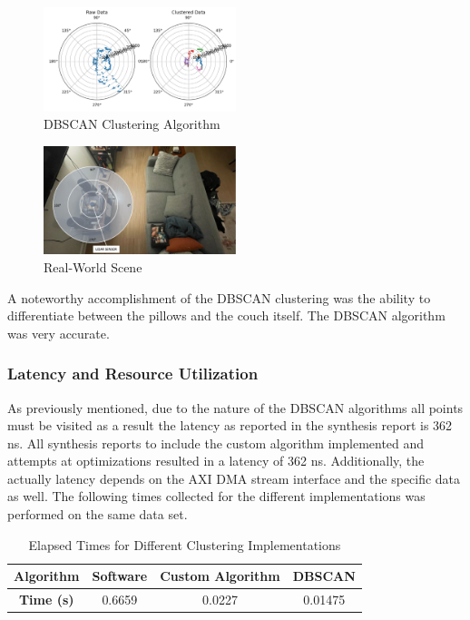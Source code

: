 \documentclass[journal]{IEEEtran} %
\begin{document}
\begin{figure}[h]
  \centering
  \includegraphics[width=0.5\textwidth]{clusterAccuracy.PNG}
  \caption{DBSCAN Clustering Algorithm}
  \label{fig:dbscan}
\end{figure}

\begin{figure}[h]
\centering
\includegraphics[width=0.5\textwidth]{realWorldScene}
\caption{Real-World Scene}
\label{fig:realworld}
\end{figure}

A noteworthy accomplishment of the DBSCAN clustering was the ability to differentiate between the pillows and the couch itself. The DBSCAN algorithm was very accurate.\\

\subsubsection{Latency and Resource Utilization}

As previously mentioned, due to the nature of the DBSCAN algorithms all points must be visited as a result the latency as reported in the synthesis report is 362 ns. All synthesis reports to include the custom algorithm implemented and attempts at optimizations resulted in a latency of 362 ns. Additionally, the actually latency depends on the AXI DMA stream interface and the specific data as well. The following times collected for the different implementations was performed on the same data set.

\begin{table}[h]
\centering
\begin{tabular}{|c|c c c|}
\hline
\textbf{Algorithm} & \textbf{Software} & \textbf{Custom Algorithm} & \textbf{DBSCAN} \\
 \hline
\textbf{Time (s)} & 0.6659 & 0.0227 & 0.01475 \\
 \hline
\end{tabular}
\caption{Elapsed Times for Different Clustering Implementations}
\label{table:processing_times}
\end{table}
\end{document}

